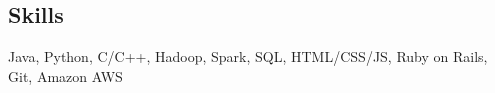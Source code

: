 \documentclass[10pt,margin,line]{resume}
\begin{document}
\begin{resume}
\section{\mysidestyle Skills}
    Java, Python, C/C++, Hadoop, Spark, SQL, HTML/CSS/JS, Ruby on Rails, Git, Amazon AWS\\

\end{resume}
\end{document}
